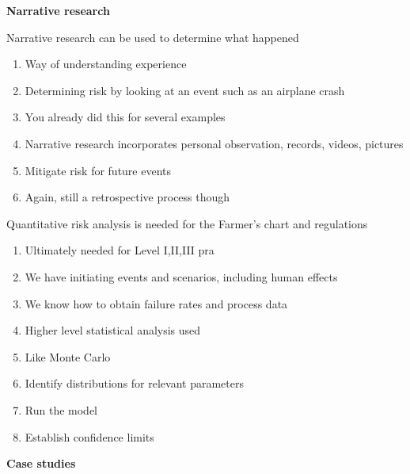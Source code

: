 \documentclass[aspectratio=1610,pdftex,dvipsnames,compress,xcolor={dvipsnames}]{beamer}
\newcommand{\acs}{\acrshort} %
\begin{document}
\begin{frame}[plain]{}
    \centering\LARGE\textbf{Narrative research}
\end{frame}


\addtocounter{framenumber}{-1}
\begin{frame}{Narrative research can be used to determine what happened}
    \begin{enumerate}[series=outerlist,topsep=0pt,itemsep=17pt,leftmargin=*,label=(\arabic*)]
        \item[]Way of understanding experience
        \item[]Determining risk by looking at an event such as an airplane crash
        \item[]You already did this for several examples
        \item[]Narrative research incorporates personal observation, records, videos, pictures
        \item[]Mitigate risk for future events
        \item[]Again, still a retrospective process though
    \end{enumerate}
\end{frame}


\begin{frame}{Quantitative risk analysis is needed for the Farmer's chart and regulations}
    \begin{enumerate}[series=outerlist,topsep=0pt,itemsep=15pt,leftmargin=*,label=(\arabic*)]
        \item[]Ultimately needed for Level I,II,III \acs{pra}
        \item[]We have initiating events and scenarios, including human effects
        \item[]We know how to obtain failure rates and process data
        \item[]Higher level statistical analysis used
        \item[]Like Monte Carlo
        \item[]Identify distributions for relevant parameters
        \item[]Run the model
        \item[]Establish confidence limits
    \end{enumerate}
\end{frame}


\begin{frame}[plain]{}
    \centering\LARGE\textbf{Case studies}
\end{frame}
\end{document}
